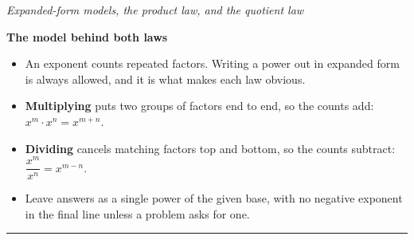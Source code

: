 \documentclass[12pt]{article}
\begin{document}

\begin{center}
\textit{Expanded-form models, the product law, and the quotient law}
\end{center}

\noindent\textbf{The model behind both laws}
\begin{itemize}[leftmargin=0.9cm, itemsep=1pt, topsep=2pt]
  \item An exponent counts repeated factors. Writing a power out in expanded form is
        always allowed, and it is what makes each law obvious.
  \item \textbf{Multiplying} puts two groups of factors end to end, so the counts add:
        $x^m \cdot x^n = x^{m+n}$.
  \item \textbf{Dividing} cancels matching factors top and bottom, so the counts subtract:
        $\dfrac{x^m}{x^n} = x^{m-n}$.
  \item Leave answers as a single power of the given base, with no negative exponent in
        the final line unless a problem asks for one.
\end{itemize}

\vspace{0.15cm}
\noindent\rule{\linewidth}{0.4pt}

\vspace{0.15cm}




\end{document}
